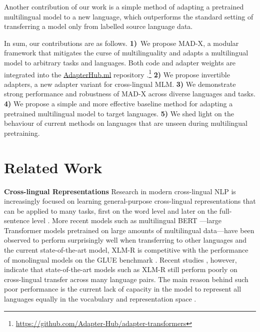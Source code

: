 \documentclass[11pt,a4paper]{article}
\newcommand{\model}[1]{\textsc{MAD-X}}
\begin{document}
Another contribution of our work is a simple method of adapting a pretrained multilingual model to a new language, which outperforms the standard setting of transferring a model only from labelled source language data. 

In sum, our contributions are as follows. \textbf{1)}~We propose \model{}, a modular framework that mitigates the curse of multilinguality and adapts a multilingual model to arbitrary tasks and languages. Both code and adapter weights are integrated into the \href{https://AdapterHub.ml}{AdapterHub.ml} repository \cite{pfeiffer2020AdapterHub}.\footnote{\href{https://github.com/Adapter-Hub/adapter-transformers}{https://github.com/Adapter-Hub/adapter-transformers}} \textbf{2)} We propose invertible adapters, a new adapter variant for cross-lingual MLM. \textbf{3)} We demonstrate strong performance and robustness of \model{} across diverse languages and tasks. \textbf{4)} We propose a simple and more effective baseline method for adapting a pretrained multilingual model to target languages. \textbf{5)} We shed light on the behaviour of current methods on 
languages that are unseen during multilingual pretraining.

 

\section{Related Work}

\noindent \textbf{Cross-lingual Representations}\hspace{0.3mm} Research in modern cross-lingual NLP is increasingly focused on learning general-purpose cross-lingual representations that can be applied to many tasks, first on the word level \cite{mikolov2013exploiting,gouws2015bilbowa,Glavas:2019acl,Ruder2019survey,Wang:2020iclr} and later on the full-sentence level \cite{Devlin2019bert,Lample2019xlm,Cao:2020iclr}. More recent models such as multilingual BERT \cite{Devlin2019bert}---large Transformer \cite{Vaswani2017transformer} models pretrained on large amounts of multilingual data---have been observed to perform surprisingly well when transferring to other languages \cite{Pires2019,Wu2019beto,Wu2020emerging} and the current state-of-the-art model, XLM-R is competitive with the performance of monolingual models on the GLUE benchmark \cite{Conneau2020xlm-r}. Recent studies \cite{Hu2020xtreme}, however, indicate that state-of-the-art models such as XLM-R still perform poorly on cross-lingual transfer across many language pairs. The main reason behind such poor performance is the current lack of capacity in the model to represent all languages equally in the vocabulary and representation space \cite{Bapna2019adapters,Artetxe2020cross-lingual,Conneau2020xlm-r}.
 
\end{document}
